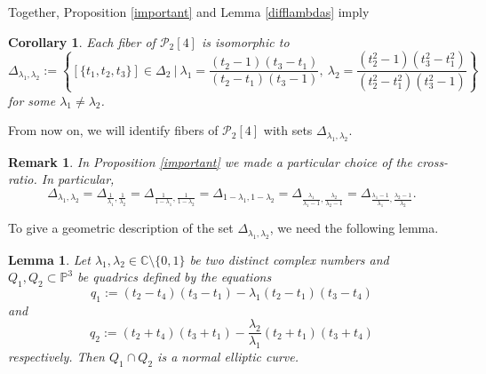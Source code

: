 \documentclass{article}
\newtheorem{cor}[thm]{Corollary}
\newtheorem{lem}[thm]{Lemma}
\newtheorem{rem}[thm]{Remark}
\numberwithin{equation}{section}
\begin{document}
Together, Proposition \ref{important} and Lemma \ref{difflambdas} imply

\begin{cor}
    Each fiber of $\mathcal{P}_2[4]$ is isomorphic to $$\Delta_{\lambda_1,\lambda_2} := \left\{[\{t_1, t_2, t_3\}] \in \Delta_2 \: | \: \lambda_1 = \frac{(t_2 - 1)(t_3 - t_1)}{(t_2 - t_1)(t_3 - 1)}, \: \lambda_2 = \frac{(t_2^2 - 1)(t_3^2 - t_1^2)}{(t_2^2 - t_1^2)(t_3^2 - 1)}\right\}$$ for some $\lambda_1 \neq \lambda_2$. 
\end{cor}

From now on, we will identify fibers of $\mathcal{P}_2[4]$ with sets $\Delta_{\lambda_1,\lambda_2}$.

\begin{rem}
\label{equalfibers}
    In Proposition \ref{important} we made a particular choice of the cross-ratio. In particular, $$\Delta_{\lambda_1,\lambda_2} = \Delta_{\frac{1}{\lambda_1}, \frac{1}{\lambda_2}} = \Delta_{\frac{1}{1-\lambda_1}, \frac{1}{1-\lambda_2}} = \Delta_{1-\lambda_1, 1-\lambda_2} = \Delta_{\frac{\lambda_1}{\lambda_1-1}, \frac{\lambda_2}{\lambda_2-1}} =\Delta_{\frac{\lambda_1-1}{\lambda_1}, \frac{\lambda_2-1}{\lambda_2}}.$$
\end{rem}

To give a geometric description of the set $\Delta_{\lambda_1,\lambda_2}$, we need the following lemma.


\begin{lem}
\label{quadrics}
    Let $\lambda_1, \lambda_2 \in \mathbb{C}\setminus \{0,1\}$ be two distinct complex numbers and $Q_1, Q_2 \subset \mathbb{P}^3$ be quadrics defined by the equations $$q_1 := (t_2 - t_4)(t_3 - t_1) - \lambda_1(t_2 - t_1)(t_3 - t_4)$$ and $$q_2 := (t_2 + t_4)(t_3 + t_1) - \frac{\lambda_2}{\lambda_1}(t_2 + t_1)(t_3 + t_4)$$ respectively. Then $Q_1 \cap Q_2$ is a normal elliptic curve.
\end{lem}
\end{document}
